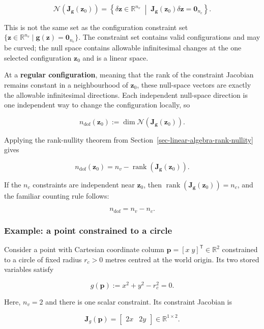 \documentclass[
  australian,
  12pt,
  letterpaper,
  DIV=11,
  numbers=noendperiod,
  twoside]{scrreprt}
\begin{document}
\[
\boxed{
\mathcal N\!\left(\mathbf J_{\mathbf g}(\mathbf z_0)\right)
=
\left\{
\delta\mathbf z\in\mathbb R^{n_v}
\;\middle|\;
\mathbf J_{\mathbf g}(\mathbf z_0)\delta\mathbf z
=
\mathbf 0_{n_c}
\right\}
}.
\]

This is not the same set as the configuration constraint set
\(\{\mathbf z\in\mathbb R^{n_v}\mid\mathbf g(\mathbf z)=\mathbf0_{n_c}\}\).
The constraint set contains valid configurations and may be curved; the
null space contains allowable infinitesimal changes at the one selected
configuration \(\mathbf z_0\) and is a linear space.

At a \textbf{regular configuration}, meaning that the rank of the
constraint Jacobian remains constant in a neighbourhood of
\(\mathbf z_0\), these null-space vectors are exactly the allowable
infinitesimal directions. Each independent null-space direction is one
independent way to change the configuration locally, so

\[
\boxed{
n_{\mathrm{dof}}(\mathbf z_0)
\mathrel{:=}
\dim\mathcal N\!\left(\mathbf J_{\mathbf g}(\mathbf z_0)\right)
}.
\]

Applying the rank-nullity theorem from
Section~\ref{sec-linear-algebra-rank-nullity} gives

\[
\boxed{
n_{\mathrm{dof}}(\mathbf z_0)
=
n_v-\operatorname{rank}\!\left(\mathbf J_{\mathbf g}(\mathbf z_0)\right)
}.
\]

If the \(n_c\) constraints are independent near \(\mathbf z_0\), then
\(\operatorname{rank}(\mathbf J_{\mathbf g}(\mathbf z_0))=n_c\), and the
familiar counting rule follows:

\[
\boxed{
n_{\mathrm{dof}}
=
n_v-n_c
}.
\]

\subsubsection{Example: a point constrained to a
circle}\label{example-a-point-constrained-to-a-circle}

Consider a point with Cartesian coordinate column
\(\mathbf p=[x\;y]^\mathsf T\in\mathbb R^2\) constrained to a circle of
fixed radius \(r_c>0\) metres centred at the world origin. Its two
stored variables satisfy

\[
g(\mathbf p)
\mathrel{:=}
x^2+y^2-r_c^2
=
0.
\]

Here, \(n_v=2\) and there is one scalar constraint. Its constraint
Jacobian is

\[
\mathbf J_g(\mathbf p)
=
\begin{bmatrix}
2x&2y
\end{bmatrix}
\in\mathbb R^{1\times2}.
\]
\end{document}

